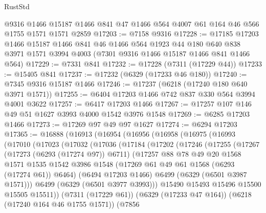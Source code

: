 \begin{lexlean}{RustStd}
\begin{coremodule}
{{    @9316
    @1466
    @15187
    @1466
    @841
    @47
    @1466
    @564
    @4007
    @61
    @164
    @46
    @566
    @1755
    @1571
    @1571
    @2859
@17203 := @7158 @9316
@17228 := @17185
    @17203
    @1466
    @15187
    @1466
    @841
    @46
    @1466
    @564
    @1923
    @44
    @180
    @640
    @838
    @3971
    @1571
    @3994
    @4003
    (@7301 @9316 @1466 @15187 @1466 @841 @1466 @564)
@17229 := @7331 @841
@17232 := @17228 (@7311 (@17229 @44))
@17233 := @15405 @841
@17237 := @17232 (@6329 (@17233 @46 @180))
@17240 := @7345 @9316 @15187 @1466
@17246 := @17237 (@6218 (@17240 @180 @640 @3971 @1571))
@17255 := @6404 @17203 @1466 @742 @837 @330 @564 @3994 @4001 @3622
@17257 := @6417 @17203 @1466
@17267 := @17257 @107 @146 @49 @51 @1627 @3993 @4000 @1542 @3976 @1548
@17269 := @6285 @17203 @1466
@17273 := @17269 @97 @49 @97 @1627
@17274 := @6294 @17203
@17365 := @16888
    (@16913
      (@16954
        (@16956
          (@16958
            (@16975
              (@16993
                (@17010
                  (@17023
                    (@17032
                      (@17036
                        (@17184
                          (@17202
                            (@17246
                              (@17255
                                (@17267
                                  (@17273 (@6293 (@17274 @97)) @6711)
                                  (@17257
                                    @88
                                    @78
                                    @49
                                    @20
                                    @1568
                                    @1571
                                    @1535
                                    @1542
                                    @3986
                                    @1548
                                    (@17269 @61 @49 @61 @1568 (@6293 (@17274 @61)) @6464)
                                    (@6494 @17203 @1466)
                                    @6499
                                    (@6329 (@6501 @3987 @1571)))
                                  @6499
                                  (@6329 (@6501 @3977 @3993)))
                                @15490
                                @15493
                                @15496
                                @15500
                                @15505
                                @15511))
                            (@7311 (@17229 @61))
                            (@6329 (@17233 @47 @164))
                            (@6218 (@17240 @164 @46 @1755 @1571))
                            (@7856
}}
\end{coremodule}
\end{lexlean}
